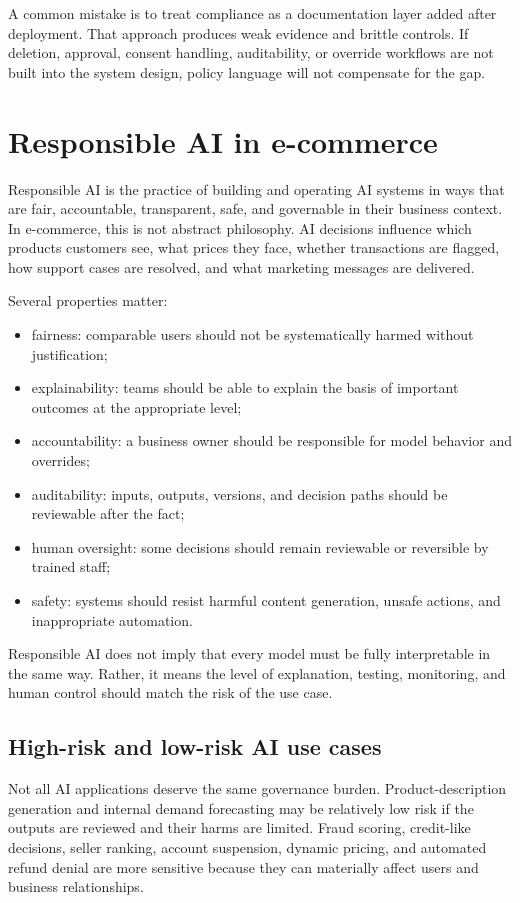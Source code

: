 A common mistake is to treat compliance as a documentation layer added after deployment. That approach produces weak evidence and brittle controls. If deletion, approval, consent handling, auditability, or override workflows are not built into the system design, policy language will not compensate for the gap.

\section{Responsible AI in e-commerce}
Responsible AI is the practice of building and operating AI systems in ways that are fair, accountable, transparent, safe, and governable in their business context. In e-commerce, this is not abstract philosophy. AI decisions influence which products customers see, what prices they face, whether transactions are flagged, how support cases are resolved, and what marketing messages are delivered.

Several properties matter:
\begin{itemize}
  \item fairness: comparable users should not be systematically harmed without justification;
  \item explainability: teams should be able to explain the basis of important outcomes at the appropriate level;
  \item accountability: a business owner should be responsible for model behavior and overrides;
  \item auditability: inputs, outputs, versions, and decision paths should be reviewable after the fact;
  \item human oversight: some decisions should remain reviewable or reversible by trained staff;
  \item safety: systems should resist harmful content generation, unsafe actions, and inappropriate automation.
\end{itemize}

Responsible AI does not imply that every model must be fully interpretable in the same way. Rather, it means the level of explanation, testing, monitoring, and human control should match the risk of the use case.

\subsection{High-risk and low-risk AI use cases}
Not all AI applications deserve the same governance burden. Product-description generation and internal demand forecasting may be relatively low risk if the outputs are reviewed and their harms are limited. Fraud scoring, credit-like decisions, seller ranking, account suspension, dynamic pricing, and automated refund denial are more sensitive because they can materially affect users and business relationships.

